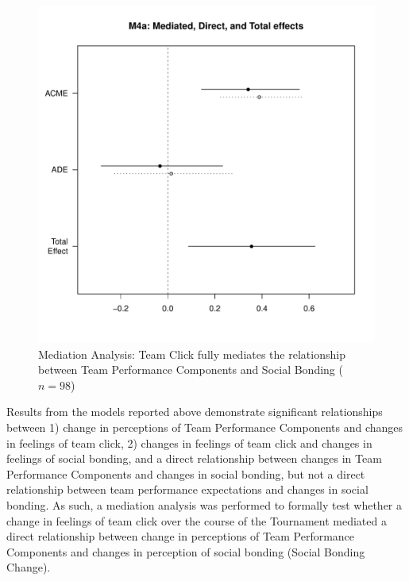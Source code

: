 \begin{CJK}{UTF8}{gbsn}
  \begin{figure}[htbp]
    \centering
    \includegraphics[scale = .5]{images/MLM4aMediationEffectsOffline1}
    \caption{Mediation Analysis: Team Click fully mediates the relationship between Team Performance Components and Social Bonding ($n = 98$)}
    \label{fig:MLM4aMediationAnalysis}
  \end{figure}




  Results from the models reported above demonstrate significant relationships between 1) change in perceptions of Team Performance Components and changes in feelings of team click, 2) changes in feelings of team click and changes in feelings of social bonding, and a direct relationship between changes in Team Performance Components and changes in social bonding, but not a direct relationship between team performance expectations and changes in social bonding. As such, a mediation analysis was performed to formally test whether a change in feelings of team click over the course of the Tournament mediated a direct relationship between change in perceptions of Team Performance Components and changes in perception of social bonding (Social Bonding Change).\\


\end{CJK}
